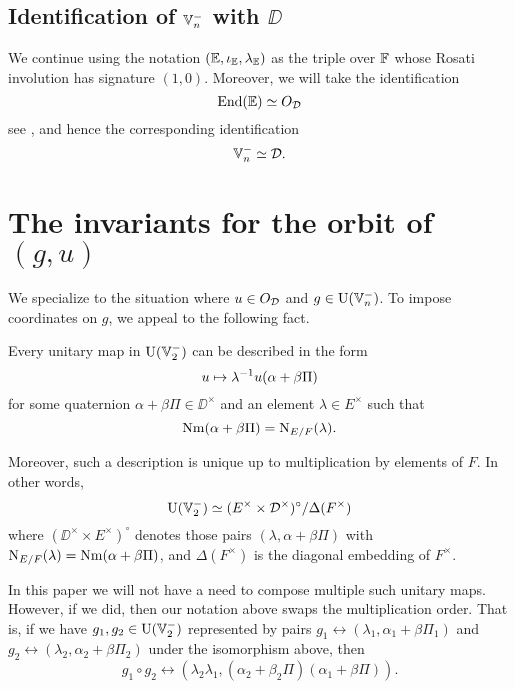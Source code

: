\subsection{Identification of $\mathbb V_n^-$ with $\DD$}
We continue using the notation $(\mathbb E, \iota_\mathbb E, \lambda_\mathbb E)$ as the triple over $\mathbb F$
whose Rosati involution has signature $(1,0)$.
Moreover, we will take the identification
\[ \operatorname{End}(\mathbb E) \simeq O_\mathcal D \]
see \cite[Remark 2.5]{ref:KR},
and hence the corresponding identification
\[ \mathbb V_n^- \simeq \mathcal D. \]

\section{The invariants for the orbit of $(g,u)$}
\label{sec:g_u_invariants}
We specialize to the situation where $u \in O_\mathcal D$ and $g \in \operatorname{U}(\mathbb V_n^-)$.
To impose coordinates on $g$, we appeal to the following fact.
\begin{lemma}
  Every unitary map in $\operatorname{U}(\mathbb V_2^-)$ can be described in the form
  \[ u \mapsto \lambda^{-1} u (\alpha + \beta \Pi) \]
  for some quaternion $\alpha + \beta \Pi \in \DD^\times$
  and an element $\lambda \in E^\times$ such that
  \[ \operatorname{Nm}(\alpha + \beta \Pi) = \operatorname{N}_{E/F}(\lambda). \]

  Moreover, such a description is unique up to multiplication by elements of $F$.
  In other words,
  \[ \operatorname{U}(\mathbb V_2^-) \simeq (E^\times \times \mathcal D^\times)^\circ / \Delta(F^\times) \]
  where $(\DD^\times \times E^\times)^\circ$
  denotes those pairs $(\lambda, \alpha + \beta \Pi)$
  with $\operatorname{N}_{E/F}(\lambda) = \operatorname{Nm}(\alpha + \beta \Pi)$,
  and $\Delta(F^\times)$ is the diagonal embedding of $F^\times$.
\end{lemma}
\begin{remark}
  In this paper we will not have a need to compose multiple such unitary maps.
  However, if we did, then our notation above swaps the multiplication order.
  That is, if we have $g_1, g_2 \in \operatorname{U}(\mathbb V_2^-)$ represented by pairs
  $g_1 \leftrightarrow (\lambda_1, \alpha_1 + \beta \Pi_1)$
  and $g_2 \leftrightarrow (\lambda_2, \alpha_2 + \beta \Pi_2)$
  under the isomorphism above, then
  \[ g_1 \circ g_2 \leftrightarrow (\lambda_2 \lambda_1, (\alpha_2 + \beta_2 \Pi)(\alpha_1 + \beta \Pi)). \]
\end{remark}


